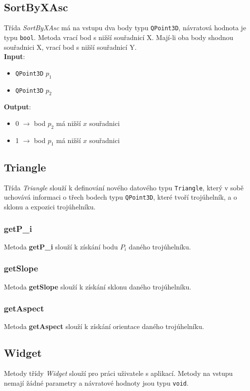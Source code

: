 \documentclass[a4paper, 12pt]{article}
\begin{document}
\subsection{SortByXAsc}
Třída \textit{SortByXAsc} má na vstupu dva body typu \texttt{QPoint3D}, návratová hodnota je typu \texttt{bool}. Metoda vrací bod s nižší  souřadnicí X. Mají-li oba body shodnou souřadnici X, vrací bod s nižší souřadnicí Y.\\

\textbf{Input}:
\begin{itemize}
\item \texttt{QPoint3D} $p_1$
\item \texttt{QPoint3D} $p_2$
\end{itemize}

\textbf{Output}:
\begin{itemize}
\item 0 $\rightarrow$ bod $p_2$ má nižší $x$ souřadnici
\item 1 $\rightarrow$ bod $p_1$ má nižší $x$ souřadnici
\end{itemize}

\subsection{Triangle}
Třída \textit{Triangle} slouží k definování nového datového typu \texttt{Triangle}, který v sobě uchovává informaci o třech bodech typu \texttt{QPoint3D}, které tvoří trojúhelník, a o sklonu a expozici trojúhelníku.

\subsubsection*{getP\_i}
Metoda \textbf{getP\_i} slouží k získání bodu $P_i$ daného trojúhelníku. 

\subsubsection*{getSlope}
Metoda \textbf{getSlope} slouží k získání sklonu daného trojúhelníku. 

\subsubsection*{getAspect}
Metoda \textbf{getAspect} slouží k získání orientace daného trojúhelníku. 


\subsection{Widget}
Metody třídy \textit{Widget} slouží pro práci uživatele s aplikací. Metody na vstupu nemají žádné parametry a návratové hodnoty jsou typu \texttt{void}.
\end{document}
